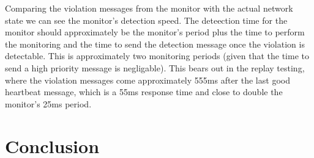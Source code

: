 \documentclass[]{llncs}
\begin{document}
Comparing the violation messages from the monitor with the actual network state we can see the monitor's detection speed. 
The deteection time for the monitor should approximately be the monitor's period plus the time to perform the monitoring and the time to send the detection message once the violation is detectable. 
This is approximately two monitoring periods (given that the time to send a high priority message is negligable). This bears out in the replay testing, where the violation messages come approximately 555ms after the last good heartbeat message, which is a 55ms response time and close to double the monitor's 25ms period.



\section{Conclusion}



\end{document}
